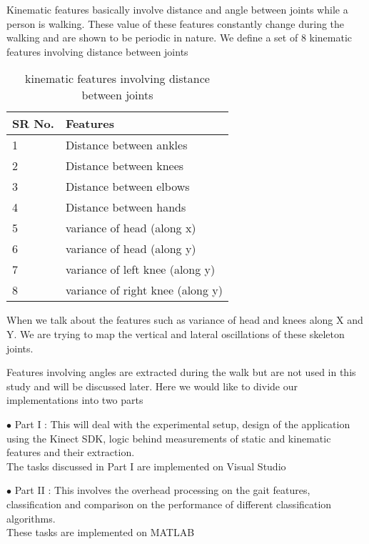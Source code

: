 \noindent Kinematic features basically involve distance and angle between joints while a person is walking. These value of these features constantly change during the walking and are shown to be periodic in nature.
We define a set of 8 kinematic features involving distance between joints 

\begin{table}
\centering
\begin{tabular}{| l | |p{6cm}|}
 \hline
SR No. & Features  \\ \hline
1 & Distance between ankles \\ \hline
2 & Distance between knees \\ \hline
3 & Distance between elbows \\\hline
4 & Distance between hands \\ \hline
5 & variance of head (along x) \\ \hline
6 & variance of head (along y) \\\hline
7 & variance of left knee (along y) \\ \hline
8 & variance of right knee (along y) \\ \hline
\end{tabular}
\caption{ kinematic features involving distance between joints}
\end{table}

\noindent When we talk about the features such as variance of head and knees along X and Y. We are trying to map the vertical and lateral oscillations of these skeleton joints.

\noindent Features involving angles are extracted during the walk but are not used in this study and will be discussed later. Here we would like to divide our implementations into two parts

\noindent$\bullet$ Part I  : This will deal with the experimental setup, design of the application using the Kinect SDK, logic behind measurements of static and kinematic features and their extraction.\\
The tasks discussed in Part I are implemented on Visual Studio

\noindent$\bullet$ Part II : This involves the overhead processing on the gait features, classification and comparison on the performance of different classification algorithms.\\
These tasks are implemented on MATLAB





























